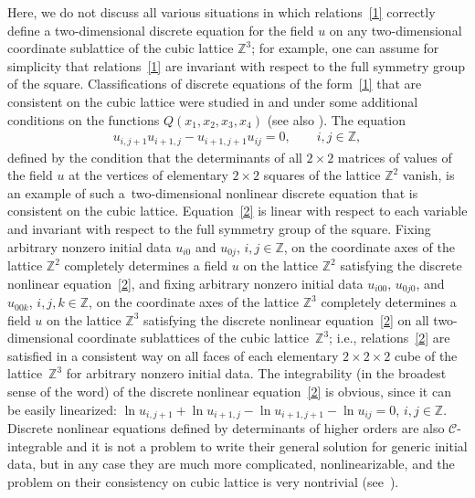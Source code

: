 \documentclass[pdftex]{sigma}
\begin{document}
Here, we do not discuss all various situations in which relations~\eqref{1}
correctly def\/ine a two-dimensional discrete equation for
the f\/ield $u$ on any two-dimensional coordinate sublattice of the
cubic lattice $\mathbb{Z}^3$; for example, one can assume for
simplicity that relations~\eqref{1} are invariant with respect to
the full symmetry group of the square. Classif\/ications of discrete
equations of the form~\eqref{1} that are consistent on the cubic
lattice were studied in \cite{6} and \cite{10} under some additional
conditions on the functions $Q (x_1, x_2, x_3, x_4)$ (see also
\cite{11}). The equation
\begin{gather} u_{i, j + 1} u_{i + 1, j} - u_{i + 1, j + 1}
u_{i j} = 0, \qquad i, j \in \mathbb{Z}, \label{2}
\end{gather}
def\/ined by
the condition that the determinants of all $2\times2$ matrices of
values of the f\/ield $u$ at the vertices of elementary $2\times2$
squares of the lattice $\mathbb Z^2$ vanish, is an example of such a~two-dimensional nonlinear discrete equation that is consistent on
the cubic lattice. Equation~\eqref{2} is linear with respect to each
variable and invariant with respect to the full symmetry group of
the square. Fixing arbitrary nonzero initial data $u_{i 0}$ and
$u_{0 j}$, $i, j \in \mathbb{Z}$, on the coordinate axes of the
lattice $\mathbb{Z}^2$ completely determines a f\/ield $u$ on the
lattice $\mathbb{Z}^2$ satisfying the discrete nonlinear equation~\eqref{2},
and f\/ixing arbitrary nonzero initial data $u_{i  0 0}$,
$u_{ 0 j 0}$, and $u_{0 0 k}$, $i, j, k \in \mathbb{Z}$, on the
coordinate axes of the lattice $\mathbb{Z}^3$ completely determines
a f\/ield $u$ on the lattice $\mathbb{Z}^3$ satisfying the discrete
nonlinear equation~\eqref{2} on all two-dimensional coordinate
sublattices of the cubic lattice~$\mathbb{Z}^3$; i.e., relations~\eqref{2}
are satisf\/ied in a consistent way on all faces of each
elementary $2 \times 2 \times 2$ cube of the lattice~$\mathbb{Z}^3$
for arbitrary nonzero initial data. The integrability (in the
broadest sense of the word) of the discrete nonlinear equation~\eqref{2}
is obvious, since it can be easily linearized: $ \ln u_{i,
j + 1} + \ln u_{i + 1, j} - \ln u_{i + 1, j + 1} - \ln u_{i j} = 0$,
$i, j \in \mathbb{Z}$.
Discrete nonlinear equations def\/ined by determinants of higher
orders are also $\mathcal{C}$-integrable and it is not a problem
to write their general solution for generic initial data, but in any case they are much more complicated, nonlinearizable,
and the problem on their consistency on cubic
lattice is very nontrivial (see~\cite{1, 2}).
\end{document}
